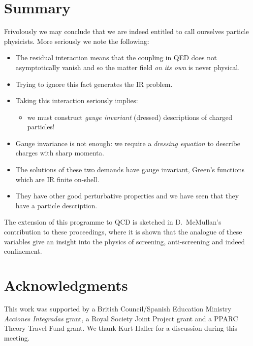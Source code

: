\documentclass[12pt,a4paper]{article}
\begin{document}
\section*{Summary}

Frivolously we may conclude that we are indeed entitled to call ourselves
particle physicists. More seriously we note the following:
\begin{itemize}
  \item The residual interaction means that the coupling in QED does not asymptotically vanish and so
  the matter field \emph{on its own} is never physical.
  \item Trying to ignore this fact generates the IR problem.
  \item Taking this interaction seriously implies:
\begin{itemize}
  \item we must construct \emph{gauge invariant} (dressed) descriptions of charged particles!
\end{itemize}
 \item Gauge invariance is not enough: we require a \emph{dressing equation} to describe charges
 with sharp momenta.
 \item The solutions of these two demands have gauge invariant, Green's functions which are  IR finite on-shell.
 \item They have other good perturbative properties and we have seen that they have a particle description.
\end{itemize}
The extension of this programme to QCD is sketched in D.~McMullan's contribution to these proceedings,
where it is shown that the analogue of these variables give an insight into the physics of
screening, anti-screening and indeed confinement.


\section*{Acknowledgments}
This work was supported by a
British Council/Spanish Education Ministry \textit{Acciones
Integradas} grant, a Royal Society Joint Project grant and a PPARC
Theory Travel Fund grant. We thank
Kurt Haller for a discussion during this meeting.
\end{document}
